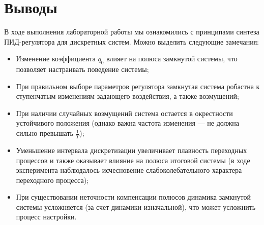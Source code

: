 \documentclass[a4paper, 14pt]{extarticle}
\theoremstyle{definition}
\theoremstyle{plain}
\theoremstyle{remark}
\begin{document}
\section{Выводы}
В ходе выполнения лабораторной работы мы ознакомились с принципами синтеза ПИД-регулятора для дискретных систем. Можно выделить следующие замечания:
\begin{itemize}
	\item Изменение коэффициента $q_0$ влияет на полюса замкнутой системы, что позволяет настраивать поведение системы;
	\item При правильном выборе параметров регулятора замкнутая система робастна к ступенчатым изменениям задающего воздействия, а также возмущений;
	\item При наличии случайных возмущений система остается в окрестности устойчивого положения (однако важна частота изменения --- не должна сильно превышать $\frac{1}{T}$);
	\item Уменьшение интервала дискретизации увеличивает плавность переходных процессов и также оказывает влияние на полюса итоговой системы (в ходе эксперимента наблюдалось исчесновение слабоколебательного характера переходного процесса);
	\item При существовании неточности компенсации полюсов динамика замкнутой системы усложняется (за счет динамики изначальной), что может усложнить процесс настройки.
\end{itemize}
\end{document}
